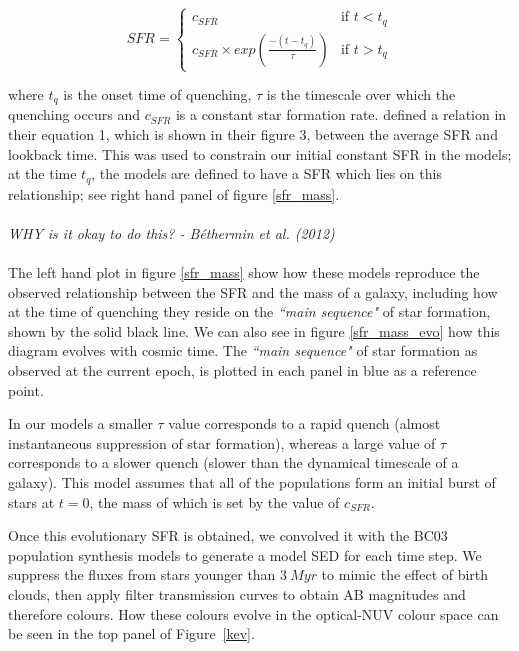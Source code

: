 \documentclass{mn2e}
\begin{document}
\[
SFR = 
\begin{cases}
c_{SFR} & \text{if } t < t_{q} \\
c_{SFR} \times exp{\left( \frac{-(t-t_{q})}{\tau}\right)} & \text{if } t > t_{q}
\end{cases}
\]

where $t_{q}$ is the onset time of quenching, $\tau$ is the timescale over which the quenching occurs and $c_{SFR}$ is a constant star formation rate. \citet{Peng} defined a relation in their equation 1, which is shown in their figure 3, between the average SFR and lookback time. This was used to constrain our initial constant SFR in the models; at the time $t_{q}$, the models are defined to have a SFR which lies on this relationship; see right hand panel of figure \ref{sfr_mass}. 
\\
\\
\emph{WHY is it okay to do this? - B\'ethermin et al. (2012)}
\\
\\
The left hand plot in figure \ref{sfr_mass} show how these models reproduce the observed relationship between the SFR and the mass of a galaxy, including how at the time of quenching they reside on the \emph{``main sequence"} of star formation, shown by the solid black line. We can also see in figure \ref{sfr_mass_evo} how this diagram evolves with cosmic time. The \emph{``main sequence"} of star formation as observed at the current epoch, is plotted in each panel in blue as a reference point. 

In our models a smaller $\tau$ value corresponds to a rapid quench (almost instantaneous suppression of star formation), whereas a large value of $\tau$ corresponds to a slower quench (slower than the dynamical timescale of a galaxy).  This model assumes that all of the populations form an initial burst of stars at $t=0$, the mass of which is set by the value of $c_{SFR}$. %

Once this evolutionary SFR is obtained, we convolved it with the BC03 population synthesis models to generate a model SED for each time step. We suppress the fluxes from stars younger than $3~Myr$ to mimic the effect of birth clouds, then apply filter transmission curves to obtain AB magnitudes and therefore colours. How these colours evolve in the optical-NUV colour space can be seen in the top panel of Figure~\ref{kev}.
\end{document}
